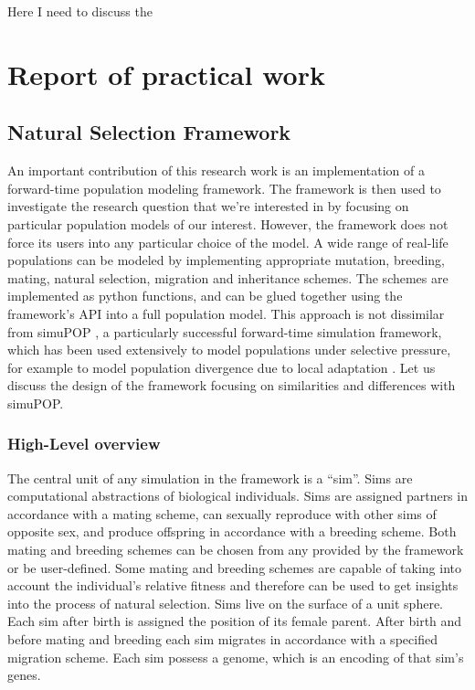 \documentclass{l4proj}
\newif\ifdebug
\begin{document}
Here I need to discuss the 

\chapter{Report of practical work}\label{practical}
\ifdebug
This section should summarize the practical work done and its results, concentrating on any unusual or original features. Enough detail should be included to assure the reader that the work has been professionally and competently done, and that the results are trustworthy. Any design features, algorithms and data structures of special interest should be described. Documentation to full software engineering standards is not required.

glossary locus, loci, polyploid, chromosome, DAG, extension modules

\fi
\section{Natural Selection Framework}
An important contribution of this research work is an implementation of a forward-time population modeling framework. The framework is then used to investigate the research question that we're interested in by focusing on particular population models of our interest. However, the framework does not force its users into any particular choice of the model. A wide range of real-life populations can be modeled by implementing appropriate mutation, breeding, mating, natural selection, migration and inheritance schemes. The schemes are implemented as python functions, and can be glued together using the framework's API into a full population model. This approach is not dissimilar from simuPOP \parencite{peng05}, a particularly successful forward-time simulation framework, which has been used extensively to model populations under selective pressure, for example to model population divergence due to local adaptation \parencite{naturalSelectionSignatures16}. Let us discuss the design of the framework focusing on similarities and differences with simuPOP.

\subsection{High-Level overview}
The central unit of any simulation in the framework is a ``sim''. Sims are computational abstractions of biological individuals. Sims are assigned partners in accordance with a mating scheme, can sexually reproduce with other sims of opposite sex, and produce offspring in accordance with a breeding scheme. Both mating and breeding schemes can be chosen from any provided by the framework or be user-defined. Some mating and breeding schemes are capable of taking into account the individual's relative fitness and therefore can be used to get insights into the process of natural selection. Sims live on the surface of a unit sphere. Each sim after birth is assigned the position of its female parent. After birth and before mating and breeding each sim migrates in accordance with a specified migration scheme. Each sim possess a genome, which is an encoding of that sim's genes.
\end{document}
